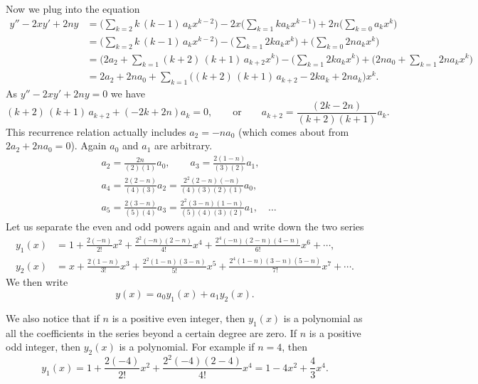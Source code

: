 \documentclass[12pt]{book}
\begin{document}
\begin{example}
Now we plug into the equation
\begin{equation*}
\begin{split}
y''-2xy'+2ny &= 
\Biggl( \sum_{k=2} k\,(k-1) \, a_k x^{k-2}  \Biggr)
-
2x
\Biggl( \sum_{k=1} k a_k x^{k-1} \Biggr)
+
2n
\Biggl( \sum_{k=0} a_k x^k \Biggr)
\\
&=
\Biggl( \sum_{k=2} k\,(k-1) \, a_k x^{k-2}  \Biggr)
-
\Biggl( \sum_{k=1} 2k a_k x^k \Biggr)
+
\Biggl( \sum_{k=0} 2n a_k x^k \Biggr)
\\
&=
\Biggl(2a_2+
 \sum_{k=1} (k+2)\,(k+1) \, a_{k+2} x^k  \Biggr)
-
\Biggl( \sum_{k=1} 2k a_k x^k \Biggr)
+
\Biggl(
2na_0 + 
\sum_{k=1} 2n a_k x^k \Biggr)
\\
&=
2a_2+2na_0+
\sum_{k=1} \bigl( (k+2)\,(k+1) \, a_{k+2} - 2ka_k + 2n a_k \bigr) x^k .
\end{split}
\end{equation*}
As $y''-2xy'+2ny = 0$ we have
\begin{equation*}
(k+2)\,(k+1) \, a_{k+2} + ( - 2k+ 2n) a_k = 0 ,
\qquad
\text{or}
\qquad
a_{k+2} = \frac{(2k-2n)}{(k+2)(k+1)} a_k .
\end{equation*}
This recurrence relation actually includes
$a_2 = -na_0$ (which comes about from $2a_2+2na_0 = 0$).
Again $a_0$ and $a_1$ are arbitrary.
\begin{align*}
& a_2 = \frac{2n}{(2)(1)}a_0, \qquad
a_3 = \frac{2(1-n)}{(3)(2)} a_1,
\\
& a_4 = \frac{2(2-n)}{(4)(3)} a_2 = \frac{2^2(2-n)(-n)}{(4)(3)(2)(1)} a_0 ,
\\
&
a_5 = \frac{2(3-n)}{(5)(4)} a_3 = \frac{2^2(3-n)(1-n)}{(5)(4)(3)(2)} a_1 ,
\quad \ldots
\end{align*}
Let us separate the even and odd powers again and and
write down the two series
\begin{align*}
y_1(x) & = 
1+\frac{2(-n)}{2!} x^2 + \frac{2^2(-n)(2-n)}{4!} x^4 + 
\frac{2^4(-n)(2-n)(4-n)}{6!} x^6 + \cdots ,
\\
y_2(x) & = 
x+\frac{2(1-n)}{3!} x^3 + \frac{2^2(1-n)(3-n)}{5!} x^5 + 
\frac{2^4(1-n)(3-n)(5-n)}{7!} x^7 + \cdots .
\end{align*}
We then write
\begin{equation}
y(x) = a_0 y_1(x) + a_1 y_2(x) .
\end{equation}

We also notice that if $n$ is a positive even integer, then $y_1(x)$ is a
polynomial as all the coefficients in the series beyond a certain
degree are zero.  If $n$ is a positive odd integer, then $y_2(x)$ is
a polynomial.  For example if $n=4$, then
\begin{equation}
y_1(x) = 1 + \frac{2(-4)}{2!} x^2 + \frac{2^2(-4)(2-4)}{4!} x^4
= 1 - 4x^2 + \frac{4}{3} x^4 .
\end{equation}
\end{example}
\end{document}
